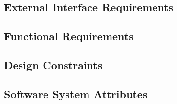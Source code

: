 \subsection{External Interface Requirements}



\subsection{Functional Requirements}




\newpage

\subsection{Design Constraints}



\newpage
\subsection{Software System Attributes}





\newpage